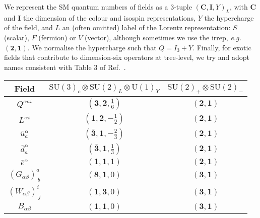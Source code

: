 We represent the SM quantum numbers of fields as a 3-tuple
$(\mathbf{C}, \mathbf{I}, Y)_{L}$, with $\mathbf{C}$ and $\mathbf{I}$ the
dimension of the colour and isospin representations, $Y$ the hypercharge of the
field, and $L$ an (often omitted) label of the Lorentz representation: $S$
(scalar), $F$ (fermion) or $V$ (vector), although sometimes we use the irrep,
\textit{e.g.} $(\mathbf{2}, \mathbf{1})$. We normalise the hypercharge such that
$Q = I_{3} + Y$. Finally, for exotic fields that contribute to dimension-six
operators at tree-level, we try and adopt names consistent with Table 3 of
Ref.~\cite{deBlas:2017xtg}.
\begin{table}[t]
  \centering
  \bgroup
  \def\arraystretch{1.5}%
  \begin{tabular}{ccc}
    \toprule
    Field                        & $\mathrm{SU}(3)_{c} \otimes \mathrm{SU}(2)_{L} \otimes \mathrm{U}(1)_{Y}$ & $\mathrm{SU}(2)_{+} \otimes \mathrm{SU}(2)_{-}$ \\
    \midrule
    $Q^{\alpha a i}$             & $(\mathbf{3}, \mathbf{2}, \tfrac{1}{6})$                                  & $(\mathbf{2}, \mathbf{1})$                      \\
    $L^{\alpha i}$               & $(\mathbf{1}, \mathbf{2}, -\tfrac{1}{2})$                                 & $(\mathbf{2}, \mathbf{1})$                      \\
    $\bar{u}^{\alpha}_a$                  & $(\bar{\mathbf{3}}, \mathbf{1}, -\tfrac{2}{3})$                           & $(\mathbf{2}, \mathbf{1})$                      \\
    $\bar{d}^{\alpha}_a$                  & $(\bar{\mathbf{3}}, \mathbf{1}, \tfrac{1}{3})$                            & $(\mathbf{2}, \mathbf{1})$                      \\
    $\bar{e}^{\alpha}$                    & $(\mathbf{1}, \mathbf{1}, 1)$                                             & $(\mathbf{2}, \mathbf{1})$                      \\
    $(G_{\alpha \beta})^a_{\ b}$ & $(\mathbf{8}, \mathbf{1}, 0)$                                             & $(\mathbf{3}, \mathbf{1})$                      \\
    $(W_{\alpha \beta})^i_{\ j}$ & $(\mathbf{1}, \mathbf{3}, 0)$                                             & $(\mathbf{3}, \mathbf{1})$                      \\
    $B_{\alpha \beta}$           & $(\mathbf{1}, \mathbf{1}, 0)$                                             & $(\mathbf{3}, \mathbf{1})$                      \\

\end{tabular}
\end{table}
